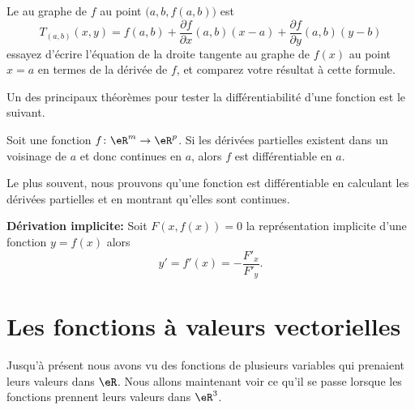Le  au graphe de $f$ au point $\big(a,b,f(a,b)\big)$ est
\begin{equation}
	T_{(a,b)}(x,y) = f(a,b) + \frac{\partial f}{\partial x}(a,b) (x-a) + \frac{\partial f}{\partial y}(a,b) (y-b)
\end{equation}
essayez d'écrire l'équation de la droite tangente au graphe de $f(x)$ au point $x=a$ en termes de la dérivée de $f$, et comparez votre résultat à cette formule.

Un des principaux théorèmes pour tester la différentiabilité d'une fonction est le suivant.

\begin{theorem}		\label{ThoProuverDiffable}
	Soit une fonction $f\colon \eR^m\to \eR^p$. Si les dérivées partielles existent dans un voisinage de $a$ et donc continues en $a$, alors $f$ est différentiable en $a$.
\end{theorem}
Le plus souvent, nous prouvons qu'une fonction est différentiable en calculant les dérivées partielles et en montrant qu'elles sont continues.

\textbf{Dérivation implicite:} Soit $F(x,f(x)) = 0$ la représentation implicite d'une fonction $y=f(x)$ alors \[y' = f'(x) = - \frac{F'_x}{F'_y}.\]


\section{Les fonctions à valeurs vectorielles}

Jusqu'à présent nous avons vu des fonctions de plusieurs variables qui prenaient leurs valeurs dans $\eR$. Nous allons maintenant voir ce qu'il se passe lorsque les fonctions prennent leurs valeurs dans $\eR^3$.

